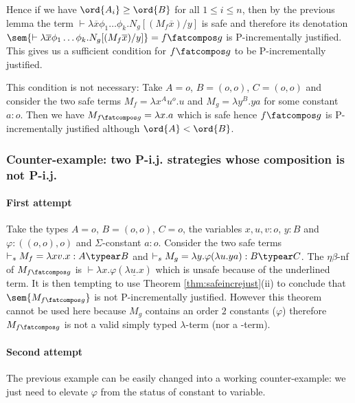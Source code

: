 Hence if we have $\ord{A_i}\geq\ord{B}$
for all $1 \leq i \leq n$,
then by the previous lemma the term $\vdash \lambda \overline{x} \phi_1 \dots \phi_k. N_g [(M_f \overline{x}) / y]$
is safe and therefore its denotation $\sem{\vdash \lambda \overline{x} \phi_1 \dots \phi_k. N_g [(M_f \overline{x}) / y]} = f\fatcompos g$ is P-incrementally justified.
This gives us a sufficient condition for $f\fatcompos g$ to be P-incrementally justified.

This condition is not necessary: Take $A=o$, $B=(o,o)$, $C=(o,o)$ and consider the two safe terms $M_f = \lambda x^A u^o.u$ and $M_g = \lambda y^B . y a$ for  some constant $a:o$. Then we have $M_{f\fatcompos g} = \lambda x . a$ which is safe hence $f\fatcompos g$ is P-incrementally justified although $\ord{A} < \ord{B}$.



\subsubsection{Counter-example: two P-i.j. strategies whose composition is not P-i.j.}
\paragraph{First attempt}

Take the types $A=o$, $B=(o,o)$, $C=o$, the variables
$x,u,v:o$, $y:B$ and $\varphi:((o,o),o)$ and $\Sigma$-constant $a:o$.
Consider the two safe terms $\vdash_s  M_f = \lambda xv.x : A\typear B$ and $\vdash_s M_g = \lambda y . \varphi (\lambda u . y a) : B\typear C$.
The $\eta\beta$-nf of $M_{f\fatcompos g}$ is $\vdash \lambda x . \varphi (\underline{\lambda u . x})$ which is unsafe because of the underlined term. It is then tempting to use
Theorem \ref{thm:safeincrejust}(ii) to conclude that
$\sem{M_{f\fatcompos g}}$ is not P-incrementally justified. However this theorem cannot be used here because $M_g$ contains an order $2$ constants ($\varphi$) therefore
$M_{f\fatcompos g}$ is not a valid simply typed $\lambda$-term (nor a \pcf-term).

\paragraph{Second attempt}
The previous example can be easily changed into a working counter-example: we just need to elevate $\varphi$ from the status of constant to variable.

